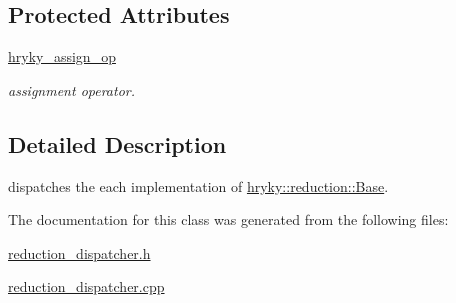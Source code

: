\subsection*{Protected Attributes}
\begin{DoxyCompactItemize}
\item 
\hypertarget{classhryky_1_1reduction_1_1_dispatcher_a476bd9236d0f139f1d910f3136c338f1}{\hyperlink{classhryky_1_1reduction_1_1_dispatcher_a476bd9236d0f139f1d910f3136c338f1}{hryky\-\_\-assign\-\_\-op}}\label{classhryky_1_1reduction_1_1_dispatcher_a476bd9236d0f139f1d910f3136c338f1}

\begin{DoxyCompactList}\small\item\em assignment operator. \end{DoxyCompactList}\end{DoxyCompactItemize}


\subsection{Detailed Description}
dispatches the each implementation of \hyperlink{classhryky_1_1reduction_1_1_base}{hryky\-::reduction\-::\-Base}. 

The documentation for this class was generated from the following files\-:\begin{DoxyCompactItemize}
\item 
\hyperlink{reduction__dispatcher_8h}{reduction\-\_\-dispatcher.\-h}\item 
\hyperlink{reduction__dispatcher_8cpp}{reduction\-\_\-dispatcher.\-cpp}\end{DoxyCompactItemize}
